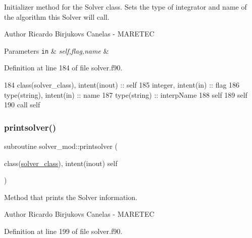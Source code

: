 Initializer method for the Solver class. Sets the type of integrator and name of the algorithm this Solver will call. 

\begin{DoxyAuthor}{Author}
Ricardo Birjukovs Canelas -\/ M\+A\+R\+E\+T\+EC 
\end{DoxyAuthor}

\begin{DoxyParams}[1]{Parameters}
\mbox{\tt in}  & {\em self,flag,name} & \\
\hline
\end{DoxyParams}


Definition at line 184 of file solver.\+f90.


\begin{DoxyCode}
184     \textcolor{keywordtype}{class}(solver\_class), \textcolor{keywordtype}{intent(inout)} :: self
185     \textcolor{keywordtype}{integer}, \textcolor{keywordtype}{intent(in)} :: flag
186     \textcolor{keywordtype}{type}(string), \textcolor{keywordtype}{intent(in)} :: name
187     \textcolor{keywordtype}{type}(string) :: interpName
188     self%
189     self%
190     \textcolor{keyword}{call }self%
\end{DoxyCode}
\mbox{\label{namespacesolver__mod_a54ea6899cce026a7a5da2dd05922628f}} 
\subsubsection{\texorpdfstring{printsolver()}{printsolver()}}
{\footnotesize\ttfamily subroutine solver\+\_\+mod\+::printsolver (\begin{DoxyParamCaption}\item[{class(\mbox{\hyperlink{structsolver__mod_1_1solver__class}{solver\+\_\+class}}), intent(inout)}]{self }\end{DoxyParamCaption})\hspace{0.3cm}{\ttfamily [private]}}



Method that prints the Solver information. 

\begin{DoxyAuthor}{Author}
Ricardo Birjukovs Canelas -\/ M\+A\+R\+E\+T\+EC 
\end{DoxyAuthor}


Definition at line 199 of file solver.\+f90.


